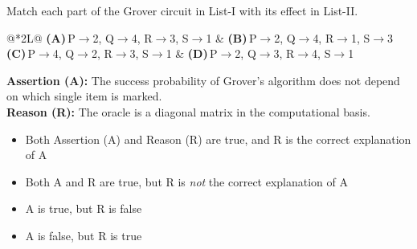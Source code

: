 \documentclass[11pt,a4paper]{article}
\newcommand{\optlabel}[1]{\textbf{(#1)}}
\newenvironment{qitem}[1]{\begin{list}{}{\setlength{\leftmargin}{3.3em}\setlength{\labelwidth}{3.1em}%
  \setlength{\labelsep}{0.2em}\setlength{\topsep}{3pt}\setlength{\parsep}{3pt}}\item[\textbf{Q.#1}\hfill]}{\end{list}}
\newcommand{\qsep}{\par\vspace{2pt}{\color{black!15}\hrule}\vspace{4pt}}
\begin{document}
\begin{qitem}{56}
Match each part of the Grover circuit in List-I with its effect in List-II.
\par\smallskip{}
\par\smallskip\noindent\begin{tabularx}{\linewidth}{@{}*{2}{L}@{}}
\optlabel{A}\,P$\to$2, Q$\to$4, R$\to$3, S$\to$1 & \optlabel{B}\,P$\to$2, Q$\to$4, R$\to$1, S$\to$3 \\[3pt]
\optlabel{C}\,P$\to$4, Q$\to$2, R$\to$3, S$\to$1 & \optlabel{D}\,P$\to$2, Q$\to$3, R$\to$4, S$\to$1
\end{tabularx}
\end{qitem}
\qsep

\begin{qitem}{57}
\textbf{Assertion (A):} The success probability of Grover's algorithm does not depend on which single item is marked.\\[1mm]
\textbf{Reason (R):} The oracle is a diagonal matrix in the computational basis.
\begin{itemize}[leftmargin=2.6em, labelsep=0.4em, itemsep=2pt, topsep=3pt]
\item[\optlabel{A}] Both Assertion (A) and Reason (R) are true, and R is the correct explanation of A
\item[\optlabel{B}] Both A and R are true, but R is \emph{not} the correct explanation of A
\item[\optlabel{C}] A is true, but R is false
\item[\optlabel{D}] A is false, but R is true
\end{itemize}
\end{qitem}
\qsep
\end{document}
